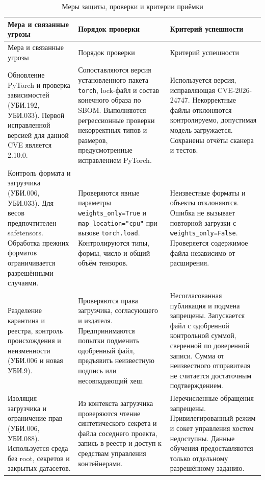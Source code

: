 \documentclass[12pt,a4paper]{report}
\begin{document}
\begingroup\small
\begin{longtable}{|P{4.1cm}|P{5.1cm}|P{4.6cm}|}
\caption{Меры защиты, проверки и критерии приёмки}\label{tab:step5-controls}\\
\hline
{}
Мера и связанные угрозы & Порядок проверки & Критерий успешности \\
\hline
\endfirsthead
\hline
{}
Мера и связанные угрозы & Порядок проверки & Критерий успешности \\
\hline
\endhead
Обновление PyTorch и проверка зависимостей (УБИ.192, УБИ.033). Первой исправленной версией для данной CVE является 2.10.0. & Сопоставляются версия установленного пакета \texttt{torch}, lock-файл и состав конечного образа по SBOM. Выполняются регрессионные проверки некорректных типов и размеров, предусмотренные исправлением PyTorch. & Используется версия, исправляющая CVE-2026-24747. Некорректные файлы отклоняются контролируемо, допустимая модель загружается. Сохранены отчёты сканера и тестов. \\
\hline
Контроль формата и загрузчика (УБИ.006, УБИ.033). Для весов предпочтителен safetensors. Обработка прежних форматов ограничивается разрешёнными случаями. & Проверяются явные параметры \texttt{weights\_only=True} и \texttt{map\_location="cpu"} при вызове \texttt{torch.load}. Контролируются типы, формы, число и общий объём тензоров. & Неизвестные форматы и объекты отклоняются. Ошибка не вызывает повторной загрузки с \texttt{weights\_only=False}. Проверяется содержимое файла независимо от расширения. \\
\hline
Разделение карантина и реестра, контроль происхождения и неизменности (УБИ.006 и новая УБИ.9). & Проверяются права загрузчика, согласующего и издателя. Предпринимаются попытки подменить одобренный файл, предъявить неизвестную подпись или несовпадающий хеш. & Несогласованная публикация и подмена запрещены. Запускается файл с одобренной контрольной суммой, сверенной по доверенной записи. Сумма от неизвестного отправителя не считается достаточным подтверждением. \\
\hline
Изоляция загрузчика и ограничение прав (УБИ.006, УБИ.088). Используется среда без root, секретов и закрытых датасетов. & Из контекста загрузчика проверяются чтение синтетического секрета и файла соседнего проекта, запись в реестр и доступ к средствам управления контейнерами. & Перечисленные обращения запрещены. Привилегированный режим и сокет управления хостом недоступны. Данные обучения предоставляются только отдельному разрешённому заданию. \\

\end{longtable}
\end{document}
